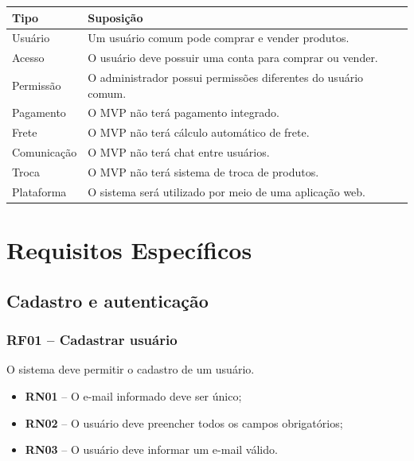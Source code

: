 \documentclass{scrreprt}
\begin{document}
\begin{center}
	\begin{tabular}{@{} l p{11.5cm} @{}}
		\toprule
		\textbf{Tipo}          & \textbf{Suposição}                                                                 \\
		\midrule
		Usuário                & Um usuário comum pode comprar e vender produtos.                                    \\
		Acesso                 & O usuário deve possuir uma conta para comprar ou vender.                             \\
		Permissão              & O administrador possui permissões diferentes do usuário comum.                       \\
		Pagamento              & O MVP não terá pagamento integrado.                                                  \\
		Frete                  & O MVP não terá cálculo automático de frete.                                          \\
		Comunicação            & O MVP não terá chat entre usuários.                                                  \\
		Troca                  & O MVP não terá sistema de troca de produtos.                                         \\
		Plataforma             & O sistema será utilizado por meio de uma aplicação web.                              \\
		\bottomrule
	\end{tabular}
\end{center}

\chapter{Requisitos Específicos}

\section{Cadastro e autenticação}

\subsection{RF01 -- Cadastrar usuário}
O sistema deve permitir o cadastro de um usuário.
\begin{itemize}
	\item \textbf{RN01} -- O e-mail informado deve ser único;
	\item \textbf{RN02} -- O usuário deve preencher todos os campos obrigatórios;
	\item \textbf{RN03} -- O usuário deve informar um e-mail válido.
\end{itemize}
\end{document}
